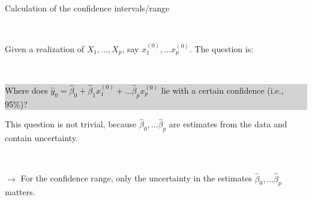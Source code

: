\documentclass[10pt,ignorenonframetext,]{beamer}
\begin{document}
\begin{frame}

\begin{block}{Calculation of the confidence intervals/range}

\(~\)

Given a realization of \(X_1, \ldots ,X_p\), say
\(x_1^{(0)}, \ldots x_p^{(0)}\). The question is:

\(~\)

\colorbox{lightgray}{\begin{minipage}{10cm}
Where does $\hat y_0 = \hat\beta_0 + \hat\beta_1 x_1^{(0)} + \ldots \hat\beta_p x_p^{(0)}$ lie with a certain confidence (i.e., 95\%)?
\end{minipage}}

\vspace{4mm}

This question is not trivial, because
\(\hat\beta_0, \ldots \hat\beta_p\) are estimates from the data and
contain uncertainty.

\(~\)

\vspace{4mm}

\(\rightarrow\) For the confidence range, only the uncertainty in the
estimates \(\hat\beta_0, \ldots \hat\beta_p\) matters.

\end{block}

\end{frame}
\end{document}
